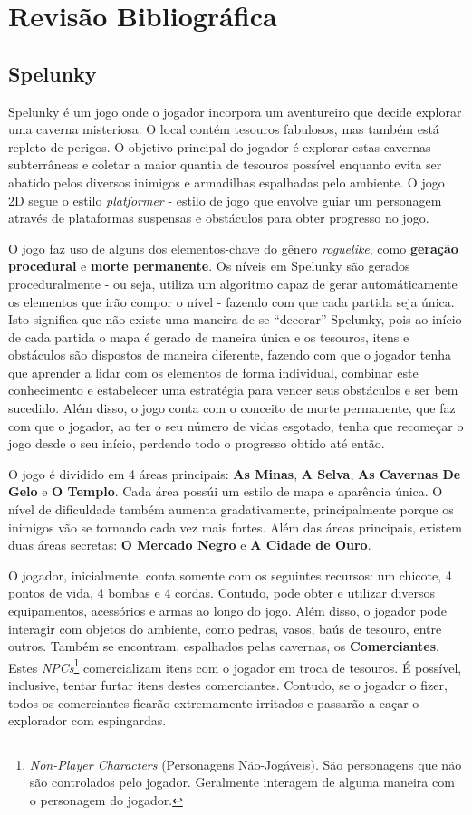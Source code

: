 \chapter{\label{chap:lit-review}Revisão Bibliográfica}

\section{Spelunky}
Spelunky \cite{SPELUNKYWEB} é um jogo onde o jogador incorpora um aventureiro
que decide explorar uma caverna misteriosa. O local contém tesouros fabulosos,
mas também está repleto de perigos. O objetivo principal do jogador é explorar
estas cavernas subterrâneas e coletar a maior quantia de tesouros possível
enquanto evita ser abatido pelos diversos inimigos e armadilhas espalhadas pelo
ambiente. O jogo 2D segue o estilo \textit{platformer} - estilo de jogo que
envolve guiar um personagem através de plataformas suspensas e obstáculos para
obter progresso no jogo.

O jogo faz uso de alguns dos elementos-chave do gênero \textit{roguelike}, como
\textbf{geração procedural} e \textbf{morte permanente}. Os níveis em Spelunky
são gerados proceduralmente - ou seja, utiliza um algoritmo capaz de gerar
automáticamente os elementos que irão compor o nível - fazendo com que cada
partida seja única. Isto significa que não existe uma maneira de se ``decorar''
Spelunky, pois ao início de cada partida o mapa é gerado de maneira única e os
tesouros, itens e obstáculos são dispostos de maneira diferente, fazendo com que
o jogador tenha que aprender a lidar com os elementos de forma individual,
combinar este conhecimento e estabelecer uma estratégia para vencer seus
obstáculos e ser bem sucedido. Além disso, o jogo conta com o conceito de morte
permanente, que faz com que o jogador, ao ter o seu número de vidas esgotado,
tenha que recomeçar o jogo desde o seu início, perdendo todo o progresso obtido
até então.

O jogo é dividido em 4 áreas principais: \textbf{As Minas}, \textbf{A Selva},
\textbf{As Cavernas De Gelo} e \textbf{O Templo}. Cada área possúi um estilo de
mapa e aparência única. O nível de dificuldade também aumenta gradativamente,
principalmente porque os inimigos vão se tornando cada vez mais fortes. Além das
áreas principais, existem duas áreas secretas: \textbf{O Mercado Negro} e
\textbf{A Cidade de Ouro}.

O jogador, inicialmente, conta somente com os seguintes recursos: um chicote, 4
pontos de vida, 4 bombas e 4 cordas. Contudo, pode obter e utilizar diversos
equipamentos, acessórios e armas ao longo do jogo. Além disso, o jogador pode
interagir com objetos do ambiente, como pedras, vasos, baús de tesouro, entre
outros. Também se encontram, espalhados pelas cavernas, os
\textbf{Comerciantes}. Estes \textit{NPCs}\footnote{\textit{Non-Player
Characters} (Personagens Não-Jogáveis). São personagens que não são controlados
pelo jogador. Geralmente interagem de alguma maneira com o personagem do
jogador.} comercializam itens com o jogador em troca de tesouros. É possível,
inclusive, tentar furtar itens destes comerciantes. Contudo, se o jogador o
fizer, todos os comerciantes ficarão extremamente irritados e passarão a caçar
o explorador com espingardas.

